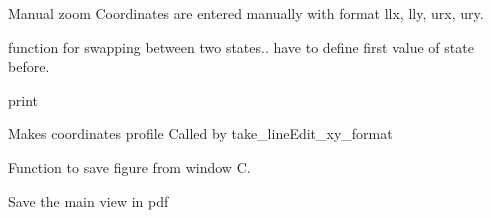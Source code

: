 \documentclass[letterpaper,10pt,openany,oneside]{sphinxmanual}
\begin{document}
\begin{fulllineitems}
\begin{fulllineitems}
\label{rst/visu2d:Visu.interface_actions.INTERACT.manual_zoom}
Manual zoom
Coordinates are entered manually with format llx, lly, urx, ury.

\end{fulllineitems}


\begin{fulllineitems}
\label{rst/visu2d:Visu.interface_actions.INTERACT.permute_states}
function for swapping between two states..
have to define first value of state before.

\end{fulllineitems}


\begin{fulllineitems}
\label{rst/visu2d:Visu.interface_actions.INTERACT.pr}
print

\end{fulllineitems}


\begin{fulllineitems}
\label{rst/visu2d:Visu.interface_actions.INTERACT.prepare_coord_profile}
Makes coordinates profile
Called by take\_lineEdit\_xy\_format

\end{fulllineitems}


\begin{fulllineitems}
\label{rst/visu2d:Visu.interface_actions.INTERACT.savefigure}
Function to save figure from window C.

\end{fulllineitems}


\begin{fulllineitems}
\label{rst/visu2d:Visu.interface_actions.INTERACT.savefigurepdf}
Save the main view in pdf


\end{fulllineitems}
\end{fulllineitems}
\end{document}
